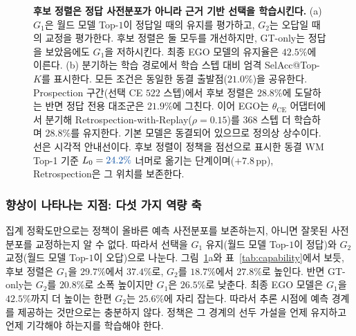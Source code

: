\documentclass[letterpaper]{article}
\newcommand{\obs}[1]{\textcolor{measuredblue}{#1}}
\newcommand{\pp}{\,\mathrm{pp}}
\newcommand{\method}{\textsc{EGO}}
\begin{document}
\begin{figure}[t]
{
}
\caption{\textbf{후보 정렬은 정답 사전분포가 아니라 근거 기반 선택을 학습시킨다.}
(a) $G_1$은 월드 모델 Top-\obs{$1$}이 정답일 때의 유지를 평가하고,
$G_2$는 오답일 때의 교정을 평가한다. 후보 정렬은 둘 모두를 개선하지만,
GT-only는 정답을 보았음에도 $G_1$을 저하시킨다. 최종 \method{} 모델의 유지율은
\obs{$42.5\%$}에 이른다. (b) 분기하는 학습 경로에서 학습 스텝 대비 엄격
SelAcc@Top-$K$를 표시한다. 모든 조건은 동일한 동결 출발점(\obs{$21.0\%$})을
공유한다. Prospection 구간(선택 CE \obs{$522$} 스텝)에서 후보 정렬은
\obs{$28.8\%$}에 도달하는 반면 정답 전용 대조군은 \obs{$21.9\%$}에 그친다.
이어 \method{}는 $\theta_{\mathrm{CE}}$ 어댑터에서 분기해
Retrospection-with-Replay($\rho{=}0.15$)를 \obs{$368$} 스텝 더 학습하며
\obs{$28.8\%$}를 유지한다. 기본 모델은 동결되어 있으므로 정의상 상수이다.
선은 시각적 안내선이다. 후보 정렬이 정책을 점선으로 표시한 동결 WM Top-1 기준
$L_0=\obs{24.2\%}$ 너머로 옮기는 단계이며(\obs{$+7.8\pp$}),
Retrospection은 그 위치를 보존한다.}
\label{fig:capability}
\end{figure}

\subsubsection{향상이 나타나는 지점: 다섯 가지 역량 축}
\label{sec:er-axes}

집계 정확도만으로는 정책이 올바른 예측 사전분포를 보존하는지, 아니면 잘못된
사전분포를 교정하는지 알 수 없다. 따라서 선택을 $G_1$ 유지(월드 모델
Top-\obs{$1$}이 정답)와 $G_2$ 교정(월드 모델 Top-\obs{$1$}이 오답)으로
나눈다. 그림~\ref{fig:capability}a와 표~\ref{tab:capability}에서 보듯,
후보 정렬은 $G_1$을 \obs{$29.7\%$}에서 \obs{$37.4\%$}로, $G_2$를
\obs{$18.7\%$}에서 \obs{$27.8\%$}로 높인다. 반면 GT-only는 $G_2$를
\obs{$20.8\%$}로 소폭 높이지만 $G_1$은 \obs{$26.5\%$}로 낮춘다.
최종 \method{} 모델은 $G_1$을 \obs{$42.5\%$}까지 더 높이는 한편
$G_2$는 \obs{$25.6\%$}에 자리 잡는다.
따라서 추론 시점에 예측 경계를 제공하는 것만으로는 충분하지 않다. 정책은 그
경계의 선두 가설을 언제 유지하고 언제 기각해야 하는지를 학습해야 한다.
\end{document}

